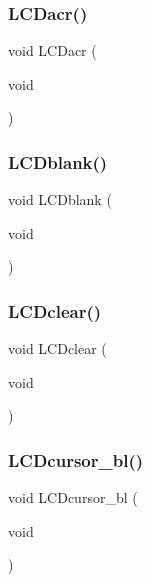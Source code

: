 \mbox{\label{lcd_8h_af8aaaaafb14508ca30208b125db7c7ca}} 
\subsubsection{L\+C\+Dacr()}
{\footnotesize\ttfamily void L\+C\+Dacr (\begin{DoxyParamCaption}\item[{void}]{ }\end{DoxyParamCaption})}

\mbox{\label{lcd_8h_afd9beebeb1deace8cc626fa140e01e29}} 
\subsubsection{L\+C\+Dblank()}
{\footnotesize\ttfamily void L\+C\+Dblank (\begin{DoxyParamCaption}\item[{void}]{ }\end{DoxyParamCaption})}

\mbox{\label{lcd_8h_a28e765a7041cb850f82f1e7b36ef4898}} 
\subsubsection{L\+C\+Dclear()}
{\footnotesize\ttfamily void L\+C\+Dclear (\begin{DoxyParamCaption}\item[{void}]{ }\end{DoxyParamCaption})}

\mbox{\label{lcd_8h_afdd0a6f1ec6a096553bf3172c0a8eb53}} 
\subsubsection{L\+C\+Dcursor\+\_\+bl()}
{\footnotesize\ttfamily void L\+C\+Dcursor\+\_\+bl (\begin{DoxyParamCaption}\item[{void}]{ }\end{DoxyParamCaption})}

\mbox{\label{lcd_8h_a7a7b0f766f8bcc06b5b9e444ba9361b7}} 
